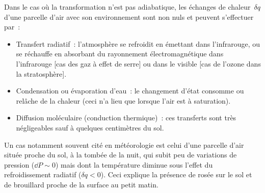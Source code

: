 \sk
Dans le cas où la transformation n'est pas adiabatique, les échanges de chaleur~$\delta q$ d'une parcelle d'air avec son environnement sont non nuls et peuvent s'effectuer par~:
\begin{itemize}
\item Transfert radiatif~: l'atmosphère se refroidit en émettant dans l'infrarouge, ou se réchauffe en absorbant du rayonnement électromagnétique dans l'infrarouge [cas des gaz à effet de serre] ou dans le visible [cas de l'ozone dans la stratosphère].
\item Condensation ou évaporation d'eau~: le changement d'état consomme ou relâche de la chaleur (ceci n'a lieu que lorsque l'air est à saturation).
\item Diffusion moléculaire (conduction thermique)~: ces transferts sont très négligeables sauf à quelques centimètres du sol.
\end{itemize}
Un cas notamment souvent cité en météorologie est celui d'une parcelle d'air située proche du sol, à la tombée de la nuit, qui subit peu de variations de pression ($\dd P \sim 0$) mais dont la température diminue sous l'effet du refroidissement radiatif ($\delta q < 0$). Ceci explique la présence de rosée sur le sol et de brouillard proche de la surface au petit matin.



